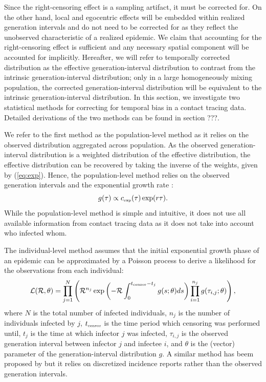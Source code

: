 \documentclass[12pt]{article}
\newcommand{\eref}[1]{(\ref{eq:#1})}
\newcommand{\RR}{\ensuremath{{\mathcal R}}}
\newcommand{\tsub}[2]{#1_{{\textrm{\tiny #2}}}}
\begin{document}
Since the right-censoring effect is a sampling artifact, it must be corrected for.
On the other hand, local and egocentric effects will be embedded within realized generation intervals and do not need to be corrected for as they reflect the unobserved characteristic of a realized epidemic.
We claim that accounting for the right-censoring effect is sufficient and any necessary spatial component will be accounted for implicitly.
Hereafter, we will refer to temporally corrected distribution as the effective generation-interval distribution to contrast from the intrinsic generation-interval distribution; only in a large homogeneously mixing population, the corrected generation-interval distribution will be equivalent to the intrinsic generation-interval distribution.
In this section, we investigate two statistical methods for correcting for temporal bias in a contact tracing data.
Detailed derivations of the two methods can be found in section ???.

We refer to the first method as the population-level method as it relies on the observed distribution aggregated across population.
As the observed generation-interval distribution is a weighted distribution of the effective distribution, the effective distribution can be recovered by taking the inverse of the weights, given by \eref{exp}.
Hence, the population-level method relies on the observed generation intervals and the exponential growth rate \citep{tomba2010some}:
\begin{equation}
g(\tau) \propto \tsub{c}{exp}(\tau) \exp(r\tau).
\end{equation}
While the population-level method is simple and intuitive, it does not use all available information from contact tracing data as it does not take into account who infected whom.

The individual-level method assumes that the initial exponential growth phase of an epidemic can be approximated by a Poisson process to derive a likelihood for the observations from each individual:
\begin{equation}
\mathcal{L}(\RR, \theta) = \prod_{j=1}^N \left(\RR^{n_j} \exp \left(- \RR \int_0^{\tsub{t}{censor} - t_j} g(s;\theta) ds \right) \prod_{i=1}^{n_j} g(\tau_{i, j}; \theta) \right),
\end{equation}
where $N$ is the total number of infected individuals, $n_j$ is the number of individuals infected by $j$, $\tsub{t}{censor}$ is the time period which censoring was performed until, $t_j$ is the time at which infector $j$ was infected, $\tau_{i,j}$ is the observed generation interval between infector $j$ and infectee $i$, and $\theta$ is the (vector) parameter of the generation-interval distribution $g$.
A similar method has beem proposed by \cite{forsberg2008likelihood} but it relies on discretized incidence reports rather than the observed generation intervals.
\end{document}
